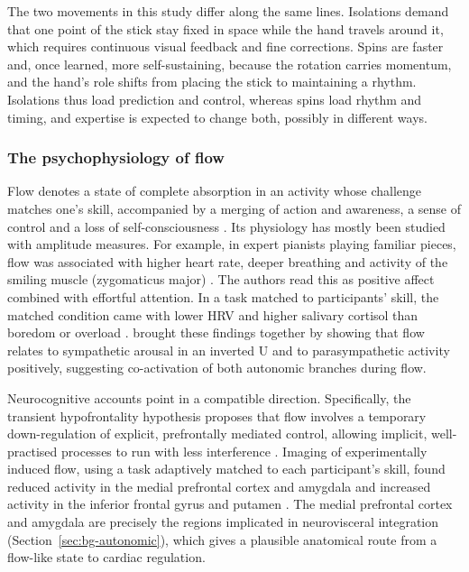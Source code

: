 The two movements in this study differ along the same lines. Isolations demand that one point of the stick stay fixed in space while the hand travels around it, which requires continuous visual feedback and fine corrections. Spins are faster and, once learned, more self-sustaining, because the rotation carries momentum, and the hand's role shifts from placing the stick to maintaining a rhythm. Isolations thus load prediction and control, whereas spins load rhythm and timing, and expertise is expected to change both, possibly in different ways.



\subsubsection{The psychophysiology of flow}

Flow denotes a state of complete absorption in an activity whose challenge matches one's skill, accompanied by a merging of action and awareness, a sense of control and a loss of self-consciousness \citep{csikszentmihalyi1990}. Its physiology has mostly been studied with amplitude measures. For example, in expert pianists playing familiar pieces, flow was associated with higher heart rate, deeper breathing and activity of the smiling muscle (zygomaticus major) \citep{demanzano2010} . The authors read this as positive affect combined with effortful attention. In a task matched to participants' skill, the matched condition came with lower HRV and higher salivary cortisol than boredom or overload \citep{keller2011} . \citet{peifer2014} brought these findings together by showing that flow relates to sympathetic arousal in an inverted U and to parasympathetic activity positively, suggesting co-activation of both autonomic branches during flow.

Neurocognitive accounts point in a compatible direction. Specifically, the transient hypofrontality hypothesis proposes that flow involves a temporary down-regulation of explicit, prefrontally mediated control, allowing implicit, well-practised processes to run with less interference \citep{dietrich2004}. Imaging of experimentally induced flow, using a task adaptively matched to each participant's skill, found reduced activity in the medial prefrontal cortex and amygdala and increased activity in the inferior frontal gyrus and putamen \citep{ulrich2014}. The medial prefrontal cortex and amygdala are precisely the regions implicated in neurovisceral integration (Section~\ref{sec:bg-autonomic}), which gives a plausible anatomical route from a flow-like state to cardiac regulation.

